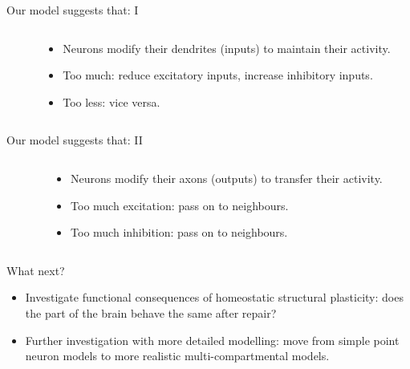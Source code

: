 \begin{frame}[c]{Our model suggests that: I}
  \begin{columns}
    \begin{column}{0.5\textwidth}
      \centering
      
    \end{column}
    \begin{column}{0.5\textwidth}
      \begin{itemize}
        \item Neurons modify their \alert{dendrites (inputs)} to maintain their activity.
          \pause{}
        \item Too much: reduce excitatory inputs, increase inhibitory inputs.
        \item Too less: vice versa.
      \end{itemize}
    \end{column}
  \end{columns}
\end{frame}
\begin{frame}[c]{Our model suggests that: II}
  \begin{columns}
    \begin{column}{0.5\textwidth}
      \centering
      
    \end{column}
    \begin{column}{0.5\textwidth}
      \begin{itemize}
        \item Neurons modify their \alert{axons (outputs)} to transfer their activity.
          \pause{}
        \item Too much excitation: pass on to neighbours.
        \item Too much inhibition: pass on to neighbours.
      \end{itemize}
    \end{column}
  \end{columns}
\end{frame}
\begin{frame}[c]{What next?}
  \begin{itemize}
    \item Investigate \alert{functional consequences} of homeostatic structural plasticity: does the part of the brain behave the same after repair?
      \pause{}
    \item \alert{Further investigation} with more detailed modelling: move from simple point neuron models to more realistic multi-compartmental models.
  \end{itemize}
\end{frame}
